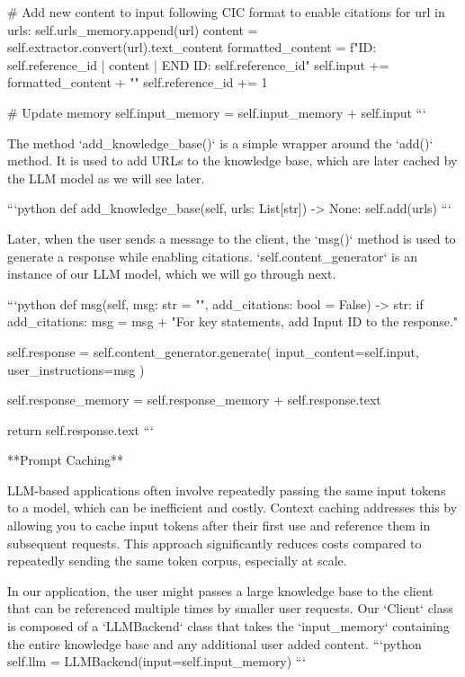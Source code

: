 {{        # Add new content to input following CIC format to enable citations
        for url in urls:
            self.urls_memory.append(url)
            content = self.extractor.convert(url).text_content
            formatted_content = f"ID: {self.reference_id} | {content} | END ID: {self.reference_id}"
            self.input += formatted_content + "\n" 
            self.reference_id += 1
        
        # Update memory
        self.input_memory = self.input_memory + self.input
```

The method `add_knowledge_base()` is a simple wrapper around the `add()` method. It is used to add URLs to the knowledge base, which are later cached by the LLM model as we will see later.

```python
    def add_knowledge_base(self, urls: List[str]) -> None:
        self.add(urls)
```


Later, when the user sends a message to the client, the `msg()` method is used to generate a response  while enabling citations. `self.content_generator` is an instance of our LLM model, which we will go through next.

```python
    def msg(self, msg: str = "", add_citations: bool = False) -> str:
        if add_citations:
            msg = msg + "\n\n For key statements, add Input ID to the response."

        self.response = self.content_generator.generate(
            input_content=self.input,
            user_instructions=msg
        )

        self.response_memory = self.response_memory + self.response.text

        return self.response.text
```

**Prompt Caching**

LLM-based applications often involve repeatedly passing the same input tokens to a model, which can be inefficient and costly. Context caching addresses this by allowing you to cache input tokens after their first use and reference them in subsequent requests. This approach significantly reduces costs compared to repeatedly sending the same token corpus, especially at scale.

In our application, the user might passes a large knowledge base to the client that can be referenced multiple times by smaller user requests. Our `Client` class is composed of a `LLMBackend` class that takes the `input_memory` containing the entire knowledge base and any additional user added content.
```python
self.llm = LLMBackend(input=self.input_memory)
```

}}
